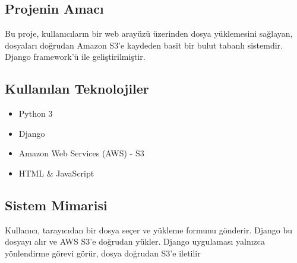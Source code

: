 \section{}



\subsection{Projenin Amacı}
Bu proje, kullanıcıların bir web arayüzü üzerinden dosya yüklemesini sağlayan, dosyaları doğrudan Amazon S3'e kaydeden basit bir bulut tabanlı sistemdir. Django framework'ü ile geliştirilmiştir.

\subsection{Kullanılan Teknolojiler}
\begin{itemize}
    \item Python 3
    \item Django
    \item Amazon Web Services (AWS) - S3
    \item HTML \& JavaScript
\end{itemize}

\subsection{Sistem Mimarisi}
Kullanıcı, tarayıcıdan bir dosya seçer ve yükleme formunu gönderir. Django bu dosyayı alır ve AWS S3'e doğrudan yükler. Django uygulaması yalnızca yönlendirme görevi görür, dosya doğrudan S3'e iletilir














